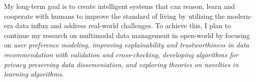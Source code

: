 \documentclass[11pt]{article}
\begin{document}
My long-term goal is to create intelligent systems that can reason, learn and cooperate with humans to improve the standard of living by utilizing the 
modern-era data influx
and address real-world challenges.
To achieve this, I plan to continue my research on multimodal data management in open-world by focusing on \textit{user preference modeling, improving explainability and trustworthiness in data recommendation with validation and cross-checking, developing algorithms for privacy preserving data dissemeniation, and exploring theories on novelties in learning algorithms}. 
\end{document}
